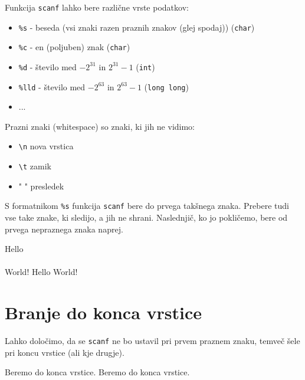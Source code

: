 \documentclass{book}
\begin{document}
Funkcija \verb+scanf+ lahko bere različne vrste podatkov:
\begin{itemize}
	\item \verb+%s+ - beseda (vsi znaki razen praznih znakov (glej spodaj)) (\verb+char+)
	\item \verb+%c+ - en (poljuben) znak (\verb+char+)
	\item \verb+%d+ - število med $-2^{31}$ in $2^{31}-1$ (\verb+int+)
	\item \verb+%lld+ - število med $-2^{63}$ in $2^{63}-1$ (\verb+long long+)
	\item ...
\end{itemize}

\noindent Prazni znaki (whitespace) so znaki, ki jih ne vidimo:
\begin{itemize}
	\item \verb+\n+ nova vrstica
	\item \verb+\t+ zamik
	\item " " presledek
\end{itemize}

S formatnikom \verb+%s+ funkcija \verb+scanf+ bere do prvega takšnega znaka. Prebere tudi vse take znake, ki sledijo, a jih ne shrani. Naslednjič, ko jo pokličemo, bere od prvega nepraznega znaka naprej.

\begin{examples}


\begin{inout}
Hello \\ \\ World!
\tcblower
Hello World!
\end{inout}


\end{examples}

\newpage
\section{Branje do konca vrstice}

Lahko določimo, da se \verb+scanf+ ne bo ustavil pri prvem praznem znaku, temveč šele pri koncu vrstice (ali kje drugje).

\begin{examples}


\begin{inout}
Beremo do konca vrstice.
\tcblower
Beremo do konca vrstice.
\end{inout}

\end{examples}
\end{document}
